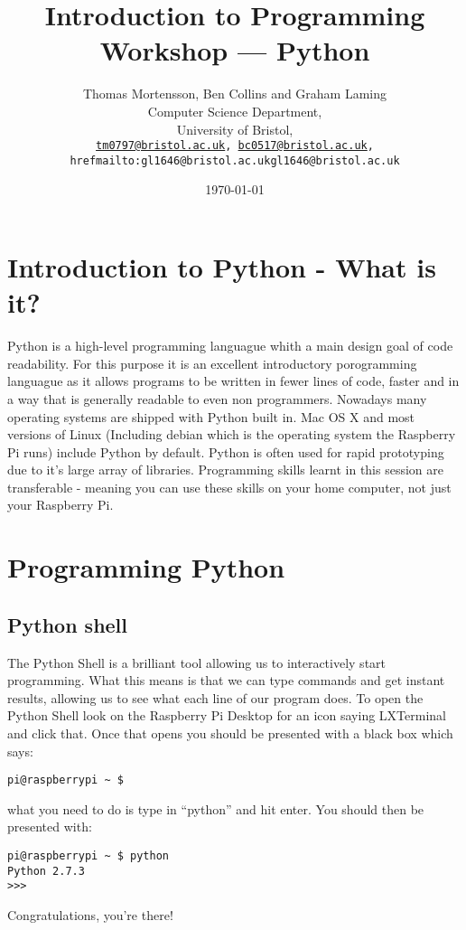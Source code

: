 \documentclass[twocolumn]{article}
\begin{document}
\lstset{style=Style1}

\title{Introduction to Programming Workshop --- Python} 
\author{Thomas Mortensson, Ben Collins and Graham Laming\\
        	Computer Science Department,\\
		University of Bristol,\\
		\texttt{\href{mailto:tm0797@bristol.ac.uk}{tm0797@bristol.ac.uk}, \href{mailto:bc0517@bristol.ac.uk}{bc0517@bristol.ac.uk}, href{mailto:gl1646@bristol.ac.uk}{gl1646@bristol.ac.uk}} 
		}
\date{\today} 
\maketitle

\section{Introduction to Python - What is it?}

Python is a high-level programming languague whith a main design goal of code readability. For this purpose it is an excellent introductory porogramming languague as it allows programs to be written in fewer lines of code, faster and in a way that is generally readable to even non programmers. Nowadays many operating systems are shipped with Python built in. Mac OS X and most versions of Linux (Including debian which is the operating system the Raspberry Pi runs) include Python by default. Python is often used for rapid prototyping due to it's large array of libraries. Programming skills learnt in this session are transferable - meaning you can use these skills on your home computer, not just your Raspberry Pi.

\section {Programming Python}



\subsection{Python shell}

The Python Shell is a brilliant tool allowing us to interactively start programming. What this means is that we can type commands and get instant results, allowing us to see what each line of our program does. To open the Python Shell look on the Raspberry Pi Desktop for an icon saying LXTerminal and click that. Once that opens you should be presented with a black box which says:
\begin{lstlisting}
pi@raspberrypi ~ $
\end{lstlisting}
what you need to do is type in ``python'' and hit enter. You should then be presented with:
\begin{lstlisting}
pi@raspberrypi ~ $ python
Python 2.7.3
>>>
\end{lstlisting}
Congratulations, you're there!
\end{document}
